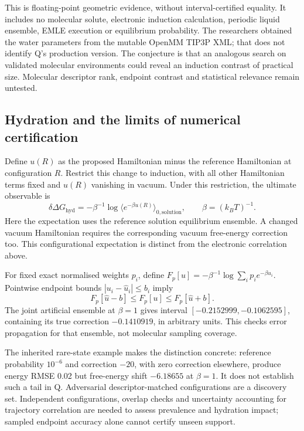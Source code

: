 \documentclass{article}
\begin{document}
This is floating-point geometric evidence, without interval-certified equality. It includes no molecular solute, electronic induction calculation, periodic liquid ensemble, EMLE execution or equilibrium probability. The researchers obtained the water parameters from the mutable OpenMM TIP3P XML; that does not identify Q's production version. The conjecture is that an analogous search on validated molecular environments could reveal an induction contrast of practical size. Molecular descriptor rank, endpoint contrast and statistical relevance remain untested.

\subsection{Hydration and the limits of numerical certification}

Define $u(R)$ as the proposed Hamiltonian minus the reference Hamiltonian at configuration $R$. Restrict this change to induction, with all other Hamiltonian terms fixed and $u(R)$ vanishing in vacuum. Under this restriction, the ultimate observable is
\begin{equation*}
\delta\Delta G_{\mathrm{hyd}}=-\beta^{-1}\log\langle e^{-\beta u(R)}\rangle_{0,\mathrm{solution}},\qquad \beta=(k_BT)^{-1}.
\end{equation*}
Here the expectation uses the reference solution equilibrium ensemble. A changed vacuum Hamiltonian requires the corresponding vacuum free-energy correction too. This configurational expectation is distinct from the electronic correlation above.

For fixed exact normalised weights $p_i$, define $F_p[u]=-\beta^{-1}\log\sum_i p_i e^{-\beta u_i}$. Pointwise endpoint bounds $|u_i-\widehat u_i|\le b_i$ imply
\begin{equation*}
F_p[\widehat u-b]\le F_p[u]\le F_p[\widehat u+b].
\end{equation*}
The joint artificial ensemble at $\beta=1$ gives interval $[-0.2152999,-0.1062595]$, containing its true correction $-0.1410919$, in arbitrary units. This checks error propagation for that ensemble, not molecular sampling coverage.

The inherited rare-state example makes the distinction concrete: reference probability $10^{-6}$ and correction $-20$, with zero correction elsewhere, produce energy RMSE 0.02 but free-energy shift $-6.18655$ at $\beta=1$. It does not establish such a tail in Q. Adversarial descriptor-matched configurations are a discovery set. Independent configurations, overlap checks and uncertainty accounting for trajectory correlation are needed to assess prevalence and hydration impact; sampled endpoint accuracy alone cannot certify unseen support.
\end{document}
